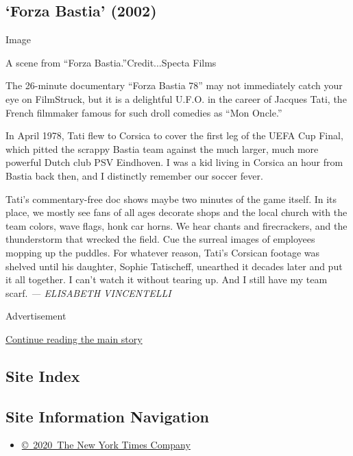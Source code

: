 \hypertarget{forza-bastia-2002}{%
\subsection{`Forza Bastia' (2002)}\label{forza-bastia-2002}}

Image

A scene from ``Forza Bastia.''Credit...Specta Films

The 26-minute documentary ``Forza Bastia 78'' may not immediately catch
your eye on FilmStruck, but it is a delightful U.F.O. in the career of
Jacques Tati, the French filmmaker famous for such droll comedies as
``Mon Oncle.''

In April 1978, Tati flew to Corsica to cover the first leg of the UEFA
Cup Final, which pitted the scrappy Bastia team against the much larger,
much more powerful Dutch club PSV Eindhoven. I was a kid living in
Corsica an hour from Bastia back then, and I distinctly remember our
soccer fever.

Tati's commentary-free doc shows maybe two minutes of the game itself.
In its place, we mostly see fans of all ages decorate shops and the
local church with the team colors, wave flags, honk car horns. We hear
chants and firecrackers, and the thunderstorm that wrecked the field.
Cue the surreal images of employees mopping up the puddles. For whatever
reason, Tati's Corsican footage was shelved until his daughter, Sophie
Tatischeff, unearthed it decades later and put it all together. I can't
watch it without tearing up. And I still have my team scarf. \emph{---
ELISABETH VINCENTELLI}

Advertisement

\protect\hyperlink{after-bottom}{Continue reading the main story}

\hypertarget{site-index}{%
\subsection{Site Index}\label{site-index}}

\hypertarget{site-information-navigation}{%
\subsection{Site Information
Navigation}\label{site-information-navigation}}

\begin{itemize}
\tightlist
\item
  \href{https://help.nytimes3xbfgragh.onion/hc/en-us/articles/115014792127-Copyright-notice}{©~2020~The
  New York Times Company}
\end{itemize}

